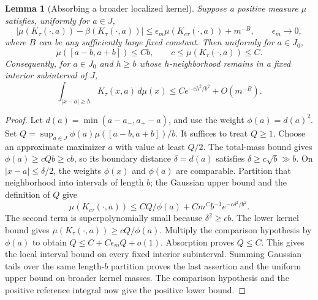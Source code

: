 \documentclass[11pt]{article}
\newtheorem{lemma}{Lemma}\newtheorem{theorem}{Theorem}
\begin{document}
\begin{lemma}[Absorbing a broader localized kernel]\label{mass}
Suppose a positive measure $\mu$ satisfies, uniformly for $a\in J$,
\[
 |\mu(K_\tau(\cdot,a))-\beta(K_\tau(\cdot,a))|
 \le \epsilon_m\mu(K_{c\tau}(\cdot,a))+m^{-B},
 \qquad \epsilon_m\longrightarrow0,
\]
where $B$ can be any sufficiently large fixed constant.
Then uniformly for $a\in J_0$,
\[
 \mu([a-b,a+b])\le Cb,\qquad
 c\le\mu(K_\tau(\cdot,a))\le C.
\]
Consequently, for $a\in J_0$ and $h\ge b$ whose $h$-neighborhood
remains in a fixed interior subinterval of $J$,
\[
 \int_{|x-a|\ge h}K_\tau(x,a)\,d\mu(x)
 \le C e^{-c h^2/b^2}+O(m^{-B}).
\]
\end{lemma}
\begin{proof}
Let $d(a)=\min(a-a_-,a_+-a)$, and use the weight $\phi(a)=d(a)^2$.
Set
$Q=\sup_{a\in J}\phi(a)\mu([a-b,a+b])/b$.
It suffices to treat $Q\ge1$. Choose an approximate maximizer $a$
with value at least $Q/2$. The total-mass bound gives
$\phi(a)\ge cQb\ge cb$, so its boundary distance
$\delta=d(a)$ satisfies $\delta\ge c\sqrt b\gg b$.
On $|x-a|\le\delta/2$, the weights $\phi(x)$ and $\phi(a)$ are
comparable. Partition that neighborhood into intervals of length $b$;
the Gaussian upper bound and the definition of $Q$ give
\[
 \mu(K_{c\tau}(\cdot,a))\le C Q/\phi(a)
       +C m^Cb^{-1}e^{-c\delta^2/b^2}.
\]
The second term is superpolynomially small because $\delta^2\ge cb$.
The lower kernel bound gives
$\mu(K_\tau(\cdot,a))\ge cQ/\phi(a)$.
Multiply the comparison hypothesis by $\phi(a)$ to obtain
$Q\le C+C\epsilon_m Q+o(1)$. Absorption proves $Q\le C$.
This gives the local interval bound on every fixed interior subinterval.
Summing Gaussian tails over the same length-$b$ partition proves the
last assertion and the uniform upper bound on broader kernel masses.
The comparison hypothesis and the positive reference integral now give
the positive lower bound.
\end{proof}
\end{document}
